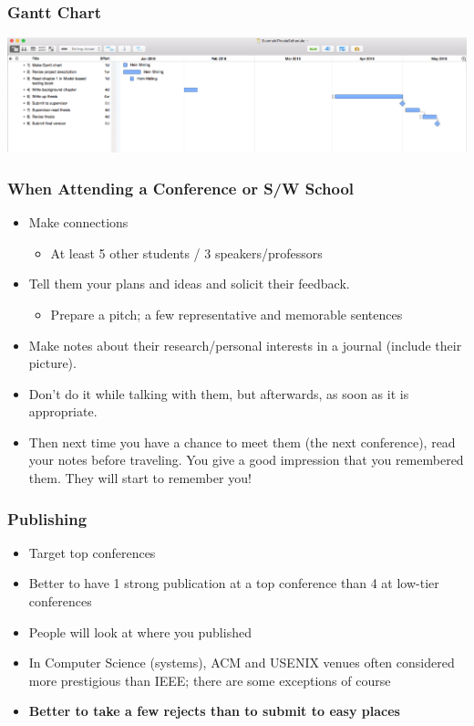 \documentclass[hyperref={pdfpagelabels=false,linkcolor=blue}, aspectratio=1610]{beamer}
\begin{document}
\begin{frame}
\frametitle{Gantt Chart}
 \begin{center}
  \includegraphics[scale=0.25]{fig/gantt-example}
 \end{center}
\end{frame}

\begin{frame}
\frametitle{When Attending a Conference or S/W School}
\begin{block}{}
 \begin{itemize}
  \item Make connections
  \begin{itemize}
  	\item At least 5 other students / 3 speakers/professors
  \end{itemize}
  \item Tell them your plans and ideas and solicit their feedback.
  \begin{itemize}
  	\item Prepare a pitch; a few representative and memorable sentences
  \end{itemize}
  \item Make notes about their research/personal interests in a journal (include their picture).
  \item Don't do it while talking with them, but afterwards, as soon as it is appropriate.
  \item Then next time you have a chance to meet them (the next conference), read your notes before traveling. You give a good impression that you remembered them. They will start to remember you!
 \end{itemize}
\end{block}
\end{frame}

\begin{frame}
\frametitle{Publishing}
\begin{block}{}
 \begin{itemize}
  \item Target top conferences
  \item Better to have 1 strong publication at a top conference 
        than 4 at low-tier conferences
  \item People will look at where you published
  \item In Computer Science (systems), ACM and USENIX venues often considered more prestigious than IEEE; there are some exceptions of course
  \item \textbf{Better to take a few rejects than to submit to easy places}
 \end{itemize}
\end{block}
\end{frame}
\end{document}

